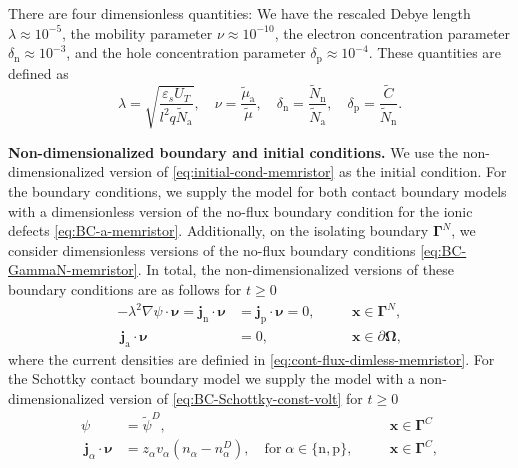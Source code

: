 \documentclass[10pt,a4paper, final]{article}
\def\electrons{\text{n}}
\def\holes{\text{p}}
\def\ions{\text{a}}
\theoremstyle{definition}								%
\numberwithin{equation}{section}
\numberwithin{figure}{section}
\numberwithin{theorem}{section}
\begin{document}
There are four dimensionless quantities:
We have the rescaled Debye length $\lambda \approx 10^{-5}$, the mobility parameter $\nu \approx 10^{-10}$, the electron concentration parameter $ \delta_\electrons \approx10^{-3}$, and the hole concentration parameter $\delta_\holes \approx10^{-4}$.
These quantities are defined as
\begin{equation*}
    \lambda = \sqrt{\frac{\varepsilon_sU_T}{l^2q\tilde{N}_\ions}},
    \quad \nu = \frac{\tilde{\mu}_{\ions}}{\tilde{\mu}},
    \quad \delta_\electrons = \frac{\tilde{N}_\electrons}{\tilde{N}_\ions},
    \quad \delta_\holes = \frac{\tilde{C}}{\tilde{N}_\electrons}.
\end{equation*}

\textbf{Non-dimensionalized boundary and initial conditions.}
We use the non-dimensionalized version of \eqref{eq:initial-cond-memristor}  as the initial condition.
For the boundary conditions, we supply the model for both contact boundary models with a dimensionless version of the no-flux boundary condition for the ionic defects \eqref{eq:BC-a-memristor}.
Additionally, on the isolating boundary $\mathbf{\Gamma}^N$, we consider dimensionless versions of the no-flux boundary conditions \eqref{eq:BC-GammaN-memristor}.
In total, the non-dimensionalized versions of these boundary conditions are as follows for $t\geq 0$
\begin{subequations} \label{eq:memristor-BC}
    \begin{alignat}{2}
       -\lambda^2 \nabla \psi \cdot {\boldsymbol{\nu}} = \mathbf{j}_\electrons \cdot {\boldsymbol{\nu}} &= \mathbf{j}_\holes \cdot {\boldsymbol{\nu}}
        = 0, \quad
        &&\mathbf{x} \in \mathbf{\Gamma}^N, \label{eq:memristor-Neumann-BC-dimless} \\
        ~
        \mathbf{j}_\ions \cdot {\boldsymbol{\nu}}
        &=0, \quad
        &&\mathbf{x} \in \partial \mathbf{\Omega}, \label{eq:memristor-BC-anion-dimless}
    \end{alignat}
\end{subequations}
where the current densities are definied in \eqref{eq:cont-flux-dimless-memristor}.
For the Schottky contact boundary model we supply the model with a non-dimensionalized version of \eqref{eq:BC-Schottky-const-volt} for $t\geq 0$
\begin{subequations} \label{eq:memristor-Schottky-BC-dimless}
    \begin{alignat}{2}
        \psi &= \tilde{\psi}^D, \quad &&\mathbf{x} \in \mathbf{\Gamma}^C \label{eq:memristor-Schottky-BC-dimless-psi}\\
        ~
        \mathbf{j}_\alpha \cdot \boldsymbol{\nu}  &= z_\alpha v_\alpha \left( n_\alpha - n_\alpha^D \right), \quad \text{for}\; \alpha \in \{\electrons, \holes \}, \quad &&\mathbf{x} \in \mathbf{\Gamma}^C, \label{eq:memristor-Schottky-BC-dimless-n-p}
    \end{alignat}
\end{subequations}
\end{document}

